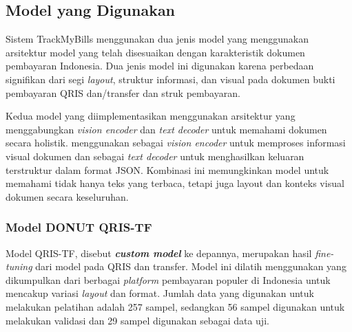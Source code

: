 \subsection{Model yang Digunakan}
\label{subsec:model-yang-digunakan}

Sistem TrackMyBills menggunakan dua jenis model yang menggunakan arsitektur model \donut{} yang telah disesuaikan dengan karakteristik dokumen pembayaran Indonesia. Dua jenis model ini digunakan karena perbedaan signifikan dari segi \emph{layout}, struktur informasi, dan visual pada dokumen bukti pembayaran QRIS dan/transfer dan struk pembayaran.

Kedua model yang diimplementasikan menggunakan arsitektur \transformer{} yang menggabungkan \emph{vision encoder} dan \emph{text decoder} untuk memahami dokumen secara holistik. \donut{} menggunakan \swin{} sebagai \emph{vision encoder} untuk memproses informasi visual dokumen dan \bart{} sebagai \emph{text decoder} untuk menghasilkan keluaran terstruktur dalam format JSON. Kombinasi ini memungkinkan model untuk memahami tidak hanya teks yang terbaca, tetapi juga layout dan konteks visual dokumen secara keseluruhan.


\subsubsection{Model DONUT QRIS-TF}
\label{subsubsec:donut-qris-tf}

Model \donut{} QRIS-TF, disebut \textbf{\emph{custom model}} ke depannya, merupakan hasil \emph{fine-tuning} dari model \donutcord{} pada \dataset{} QRIS dan transfer. Model ini dilatih menggunakan \dataset{} yang dikumpulkan dari berbagai \emph{platform} pembayaran populer di Indonesia untuk mencakup variasi \emph{layout} dan format. Jumlah data yang digunakan untuk melakukan pelatihan adalah 257 sampel, sedangkan 56 sampel digunakan untuk melakukan validasi dan 29 sampel digunakan sebagai data uji.

